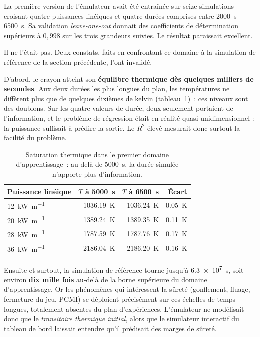 \documentclass[12pt,a4paper,french]{report}
\begin{document}
La première version de l'émulateur avait été entraînée sur seize simulations
croisant quatre puissances linéiques et quatre durées comprises entre
\SIrange{2000}{6500}{\second}. Sa validation \textit{leave-one-out} donnait des
coefficients de détermination supérieurs à $0{,}998$ sur les trois grandeurs
suivies. Le résultat paraissait excellent.

Il ne l'était pas. Deux constats, faits en confrontant ce domaine à la
simulation de référence de la section précédente, l'ont invalidé.

D'abord, le crayon atteint son \textbf{équilibre thermique dès quelques
milliers de secondes}. Aux deux durées les plus longues du plan, les
températures ne diffèrent plus que de quelques dixièmes de kelvin
(tableau~\ref{tab:saturation})~: ces niveaux sont des doublons. Sur les quatre
valeurs de durée, deux seulement portaient de l'information, et le problème de
régression était en réalité quasi unidimensionnel : la puissance suffisait à
prédire la sortie. Le $R^2$ élevé mesurait donc surtout la facilité du
problème.

\begin{table}[htbp]
\centering
\caption[Saturation thermique du premier domaine]{Saturation thermique dans le premier domaine d'apprentissage~:
au-delà de \SI{5000}{\second}, la durée simulée n'apporte plus d'information.}
\label{tab:saturation}
\begin{tabularx}{0.8\textwidth}{@{}Xrrr@{}}
\toprule
\textbf{Puissance linéique} & \textbf{$T$ à \SI{5000}{\second}} &
\textbf{$T$ à \SI{6500}{\second}} & \textbf{Écart}\\
\midrule
\SI{12}{\kilo\watt\per\metre} & \SI{1036.19}{\kelvin} & \SI{1036.24}{\kelvin}
  & \SI{0.05}{\kelvin}\\
\SI{20}{\kilo\watt\per\metre} & \SI{1389.24}{\kelvin} & \SI{1389.35}{\kelvin}
  & \SI{0.11}{\kelvin}\\
\SI{28}{\kilo\watt\per\metre} & \SI{1787.59}{\kelvin} & \SI{1787.76}{\kelvin}
  & \SI{0.17}{\kelvin}\\
\SI{36}{\kilo\watt\per\metre} & \SI{2186.04}{\kelvin} & \SI{2186.20}{\kelvin}
  & \SI{0.16}{\kelvin}\\
\bottomrule
\end{tabularx}
\end{table}

Ensuite et surtout, la simulation de référence tourne jusqu'à
\SI{6.3e7}{\second}, soit environ \textbf{dix mille fois} au-delà de la borne
supérieure du domaine d'apprentissage. Or les phénomènes qui intéressent la
sûreté (gonflement, fluage, fermeture du jeu, PCMI) se déploient précisément
sur ces échelles de temps longues, totalement absentes du plan d'expériences.
L'émulateur ne modélisait donc que le \emph{transitoire thermique initial},
alors que le simulateur interactif du tableau de bord laissait entendre qu'il
prédisait des marges de sûreté.
\end{document}
